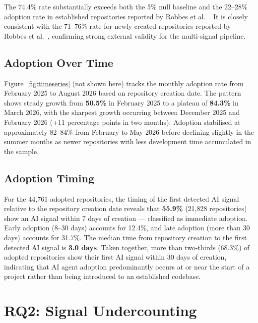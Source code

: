 The 74.4\% rate substantially exceeds both the 5\% null baseline and the 22--28\% adoption rate in established repositories reported by Robbes et al.~\cite{robbesAgenticMuch2026}. It is closely consistent with the 71--76\% rate for newly created repositories reported by Robbes et al.~\cite{robbesAgenticVery2026}, confirming strong external validity for the multi-signal pipeline.

\subsection{Adoption Over Time}

Figure~\ref{fig:timeseries} (not shown here) tracks the monthly adoption rate from February 2025 to August 2026 based on repository creation date. The pattern shows steady growth from \textbf{50.5\%} in February 2025 to a plateau of \textbf{84.3\%} in March 2026, with the sharpest growth occurring between December 2025 and February 2026 (+11 percentage points in two months). Adoption stabilised at approximately 82--84\% from February to May 2026 before declining slightly in the summer months as newer repositories with less development time accumulated in the sample.

\subsection{Adoption Timing}

For the 44,761 adopted repositories, the timing of the first detected AI signal relative to the repository creation date reveals that \textbf{55.9\%} (21,828 repositories) show an AI signal within 7 days of creation --- classified as immediate adoption. Early adoption (8--30 days) accounts for 12.4\%, and late adoption (more than 30 days) accounts for 31.7\%. The median time from repository creation to the first detected AI signal is \textbf{3.0 days}. Taken together, more than two-thirds (68.3\%) of adopted repositories show their first AI signal within 30 days of creation, indicating that AI agent adoption predominantly occurs at or near the start of a project rather than being introduced to an established codebase.

\section{RQ2: Signal Undercounting}
\label{sec:res:rq2}

